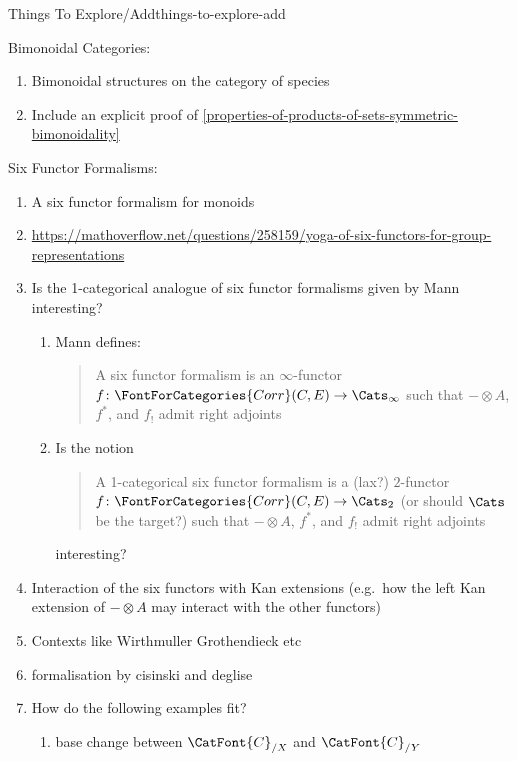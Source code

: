 \begin{remark}{Things To Explore/Add}{things-to-explore-add}
\begin{enumerate}
    \end{enumerate}
    Bimonoidal Categories:
    \begin{enumerate}
        \item Bimonoidal structures on the category of species
        \item Include an explicit proof of \cref{properties-of-products-of-sets-symmetric-bimonoidality}
    \end{enumerate}
    Six Functor Formalisms:
    \begin{enumerate}
        \item A six functor formalism for monoids
        \item \url{https://mathoverflow.net/questions/258159/yoga-of-six-functors-for-group-representations}
        \item Is the 1-categorical analogue of six functor formalisms given by Mann interesting?
            \begin{enumerate}
                \item Mann defines:
                    \begin{quote}
                        A six functor formalism is an $\infty$-functor $f\colon\FontForCategories{Corr}(C,E)\to\Cats_{\infty}$ such that $-\otimes A$, $f^{*}$, and $f_{!}$ admit right adjoints
                    \end{quote}
                \item Is the notion
                    \begin{quote}
                        A 1-categorical six functor formalism is a (lax?) $2$-functor $f\colon\FontForCategories{Corr}(C,E)\to\Cats_{2}$ (or should $\Cats$ be the target?) such that $-\otimes A$, $f^{*}$, and $f_{!}$ admit right adjoints
                    \end{quote}
                    interesting?
            \end{enumerate}
        \item Interaction of the six functors with Kan extensions (e.g.\ how the left Kan extension of $-\otimes A$ may interact with the other functors)
        \item Contexts like Wirthmuller Grothendieck etc
        \item formalisation by cisinski and deglise
        \item How do the following examples fit?
            \begin{enumerate}
                \item base change between $\CatFont{C}_{/X}$ and $\CatFont{C}_{/Y}$

\end{enumerate}
\end{enumerate}
\end{remark}
